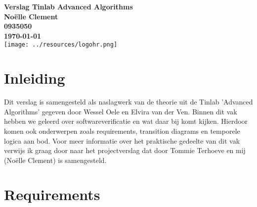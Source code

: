 \documentclass{article}
\begin{document}
\sffamily
\begin{titlepage}
  \centering
    \vfill
    {\bfseries\Huge
      Verslag Tinlab Advanced Algorithms \\
        \vskip2cm
      }
      {\bfseries\Large
        Noëlle Clement\\
      }
      {
        \bfseries\normalsize
        0935050\\
        \vskip1cm
        \today\\
    }
    \vfill
    \texttt{[image: ../resources/logohr.png]} %
    \vfill
    \vfill
\end{titlepage}

\newpage
\tableofcontents

\newpage
\section{Inleiding}
  Dit verslag is samengesteld als naslagwerk van de theorie uit de Tinlab 'Advanced Algorithms' gegeven door Wessel Oele en Elvira van der Ven. Binnen dit vak hebben we geleerd over softwareverificatie en wat daar bij komt kijken. Hierdoor komen ook onderwerpen zoals requirements, transition diagrams en temporele logica aan bod. Voor meer informatie over het praktische gedeelte van dit vak verwijs ik graag door naar het projectverslag dat door Tommie Terhoeve en mij (Noëlle Clement) is samengesteld.

\newpage
\section{Requirements}


\end{document}
